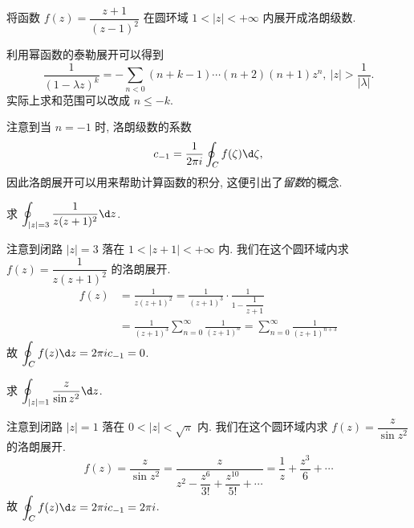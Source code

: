 \begin{exercise}
	将函数 $f(z)=\dfrac{z+1}{(z-1)^2}$ 在圆环域 $1<|z|<+\infty$ 内展开成洛朗级数.
\end{exercise}

利用幂函数的泰勒展开可以得到
\[\frac1{(1-\lambda z)^k}=-\sum_{n<0}(n+k-1)\cdots(n+2)(n+1)z^n,\ |z|>\frac1{|\lambda|}.\]
实际上求和范围可以改成 $n\le -k$.

注意到当 $n=-1$ 时, 洛朗级数的系数
\[c_{-1}=\frac1{2\pi i}\oint_C f(\zeta)\d\zeta,\]
因此洛朗展开可以用来帮助计算函数的积分,
这便引出了\emph{留数}的概念.


\begin{example}
	求 $\displaystyle\oint_{|z|=3}\frac1{z(z+1)^2}\d z$.
\end{example}

\begin{solution}
	注意到闭路 $|z|=3$ 落在 $1<|z+1|<+\infty$ 内.
	{我们在这个圆环域内求 $f(z)=\dfrac1{z(z+1)^2}$ 的洛朗展开.
		\begin{align*}
		f(z)&=\frac1{z(z+1)^2}=\frac1{(z+1)^3}\cdot\frac1{1-\dfrac1{z+1}}\\
		&{=\frac1{(z+1)^3}\sum_{n=0}^\infty\frac1{(z+1)^n}}
		{=\sum_{n=0}^{\infty}\frac1{(z+1)^{n+3}}}
		\end{align*}故
		$\displaystyle\oint_Cf(z)\d z=2\pi i c_{-1}=0$.}
\end{solution}
% 

\begin{example}
	求 $\displaystyle\oint_{|z|=1}\frac{z}{\sin z^2}\d z$.
\end{example}

\begin{solution}
	注意到闭路 $|z|=1$ 落在 $0<|z|<\sqrt \pi$ 内.
	{我们在这个圆环域内求 $f(z)=\dfrac{z}{\sin z^2}$ 的洛朗展开.
		\[
		f(z)=\frac{z}{\sin z^2}=
		\frac{z}{z^2-\dfrac{z^6}{3!}+\dfrac{z^{10}}{5!}+\cdots}
		{=\frac1z+\frac{z^3}6+\cdots}
		\]故
		$\displaystyle\oint_Cf(z)\d z=2\pi i c_{-1}=2\pi i$.}
\end{solution}





